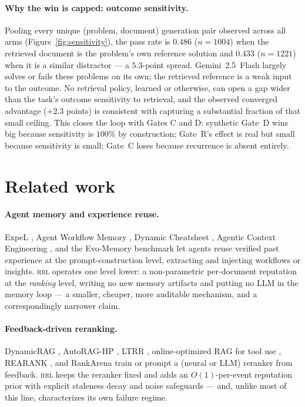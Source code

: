 \documentclass[11pt]{article}
\newcommand{\rrl}{\textsc{rrl}}
\begin{document}
\paragraph{Why the win is capped: outcome sensitivity.} Pooling every unique
(problem, document) generation pair observed across all arms
(Figure~\ref{fig:sensitivity}), the pass rate is $0.486$ ($n{=}1004$) when
the retrieved document is the problem's own reference solution and $0.433$
($n{=}1221$) when it is a similar distractor --- a $5.3$-point spread.
Gemini~2.5~Flash largely solves or fails these problems on its own; the
retrieved reference is a weak input to the outcome. No retrieval policy,
learned or otherwise, can open a gap wider than the task's outcome
sensitivity to retrieval, and the observed converged advantage ($+2.3$
points) is consistent with capturing a substantial fraction of that small
ceiling. This closes the loop with Gates C and D: synthetic Gate~D wins big
because sensitivity is $100\%$ by construction; Gate~R's effect is real but
small because sensitivity is small; Gate~C loses because recurrence is
absent entirely.

\section{Related work}
\label{sec:related}

\paragraph{Agent memory and experience reuse.} ExpeL \citep{zhao2024expel},
Agent Workflow Memory \citep{wang2024awm}, Dynamic Cheatsheet
\citep{suzgun2025cheatsheet}, Agentic Context Engineering \citep{ace2025},
and the Evo-Memory benchmark \citep{evomemory2025} let agents reuse verified
past experience at the prompt-construction level, extracting and injecting
workflows or insights. \rrl{} operates one level lower: a non-parametric
per-document reputation at the \emph{ranking} level, writing no new memory
artifacts and putting no LLM in the memory loop --- a smaller, cheaper, more
auditable mechanism, and a correspondingly narrower claim.

\paragraph{Feedback-driven reranking.} DynamicRAG \citep{dynamicrag2025},
AutoRAG-HP \citep{fu2024autorag}, LTRR \citep{kim2025ltrr}, online-optimized
RAG for tool use \citep{onlinerag2025}, REARANK \citep{rearank2025}, and
RankArena \citep{rankarena2025} train or prompt a (neural or LLM) reranker
from feedback. \rrl{} keeps the reranker fixed and adds an $O(1)$-per-event
reputation prior with explicit staleness decay and noise safeguards --- and,
unlike most of this line, characterizes its own failure regime.
\end{document}
